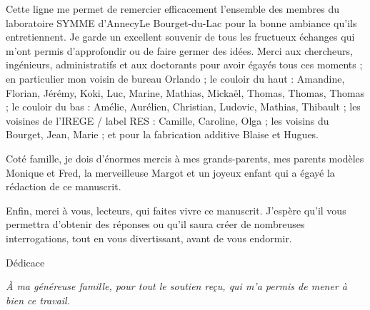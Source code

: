 \bigskip
\noindent
Cette ligne me permet de remercier efficacement l'ensemble des membres du laboratoire SYMME d'Annecy\textendash Le Bourget-du-Lac pour la bonne ambiance qu'ils entretiennent.
Je garde un excellent souvenir de tous les fructueux échanges qui m'ont permis d'approfondir ou de faire germer des idées.
Merci aux chercheurs, ingénieurs, administratifs et aux doctorants pour avoir égayés tous ces moments ; en particulier mon voisin de bureau Orlando ; le couloir du haut : Amandine, Florian, Jérémy, Koki, Luc, Marine, Mathias, Mickaël, Thomas, Thomas, Thomas ; le couloir du bas : Amélie, Aurélien, Christian, Ludovic, Mathias, Thibault ; les voisines de l'IREGE / label RES : Camille, Caroline, Olga ; les voisins du Bourget, Jean, Marie ; et pour la fabrication additive Blaise et Hugues.

\bigskip
\noindent
Coté famille, je dois d'énormes mercis à mes grands-parents, mes parents modèles \textemdash Monique et Fred\textemdash, la merveilleuse Margot et un joyeux enfant qui a égayé la rédaction de ce manuscrit.

\bigskip
\noindent
Enfin, merci à vous, lecteurs, qui faites vivre ce manuscrit.
J'espère qu'il vous permettra d'obtenir des réponses ou qu'il saura créer de nombreuses interrogations, tout en vous divertissant, avant de vous endormir.

\vspace*{5mm}
\begin{flushright}
	\fontsize{20pt}{20pt}\selectfont\textnormal{Dédicace}
\end{flushright}
\begin{flushright}
	\emph{À ma généreuse famille, pour tout le soutien reçu, qui m'a permis de mener à bien ce travail.}
\end{flushright}

\newpage  %
